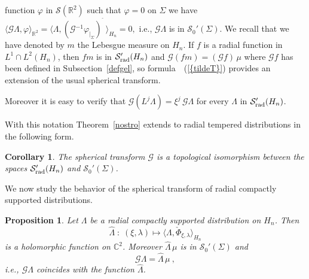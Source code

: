 \documentclass[12pt,a4paper]{amsart}
\theoremstyle{plain}
\newtheorem{corollary}[theorem]{Corollary}
\newtheorem{proposition}[theorem]{Proposition}
\theoremstyle{definition}
\numberwithin{equation}{section}
\begin{document}
function ${\varphi}$ in ${\mathcal S}({\mathbb R}^2)$ such that ${\varphi}=0$  on ${\Sigma}$ we have
$
{\langle {{\mathcal G} \Lambda},{\varphi} \rangle_{{\mathbb R}^2}}
={\langle {\Lambda},{({\mathcal G}{^{-1}} {\varphi}_{|_\Sigma})^{\check{\phantom a}}} \rangle_{{H_{n}}}}
=0,
$
i.e., ${\mathcal G}\Lambda$ is in ${\mathcal S}_0'({\Sigma})$.  
We recall that we have denoted by ${m}$ the Lebesgue measure on ${{H_{n}}}$.
If  $f$ is a radial function in $L^1\cap L^2({{H_{n}}})$,
then $f{m}$ is in ${{\mathcal S}'_{\text{\rm rad}}({{H_{n}}})}$
and ${\mathcal G} (f{m})=({\mathcal G} f)\,\mu$ where ${\mathcal G} f$ has been defined in Subsection~\ref{defgel},
so formula~{~(\ref{{tildeT}})} provides an extension of the usual spherical transform.
 

Moreover it is easy to verify 
that ${\mathcal G}{(L^j \Lambda)} 
=\xi^{j}\, {\mathcal G} \Lambda 
$
for every $\Lambda $ in ${{\mathcal S}'_{\text{\rm rad}}({{H_{n}}})}$.
{{}}

With this notation Theorem~\ref{nostro} extends to radial tempered distributions 
in the following form.

 
\begin{corollary}\label{nostrodist} The spherical transform 
${\mathcal G}$  is a topological isomorphism between
the spaces ${{\mathcal S}'_{\text{\rm rad}}({{H_{n}}})}$
 and ${\mathcal S}_0'({\Sigma})$.
\end{corollary}
 
 We now study the behavior of the spherical transform of 
  radial compactly supported distributions.    
\begin{proposition}\label{distolo} 
Let $\Lambda$ be a radial compactly supported distribution on ${{H_{n}}}$. Then   
\begin{equation}
\widehat \Lambda\; :\; (\xi,\lambda)  \longmapsto {\langle {\Lambda},{\check\Phi_{\xi,\lambda}} \rangle_{{H_{n}}}}
\end{equation}
   is a holomorphic function on ${\mathbb C}^2$. Moreover
 $\widehat \Lambda\,\mu$ is in ${\mathcal S}_0'({\Sigma})$ and
$$
{\mathcal G} \Lambda= \widehat \Lambda\,\mu\ ,
$$
i.e., ${\mathcal G} \Lambda$ coincides with the function $\widehat \Lambda$.
\end{proposition}
 
\end{document}
